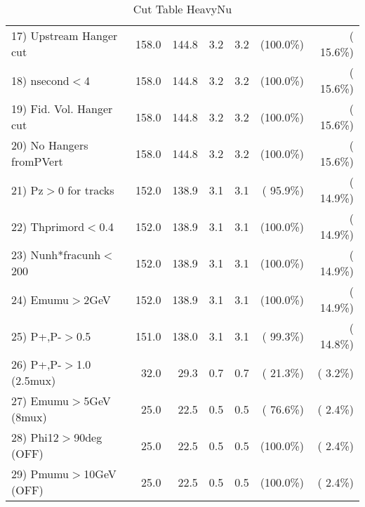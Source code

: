 \begin{table}[h!]
\begin{tabular}{||l||r|r|r|r|r|r||}
 17) Upstream Hanger cut  &        158.0 &        144.8 &          3.2 &          3.2 & (100.0\%) & ( 15.6\%) \\
 18) nsecond$<$4          &        158.0 &        144.8 &          3.2 &          3.2 & (100.0\%) & ( 15.6\%) \\
 19) Fid. Vol. Hanger cut &        158.0 &        144.8 &          3.2 &          3.2 & (100.0\%) & ( 15.6\%) \\
 20) No Hangers fromPVert &        158.0 &        144.8 &          3.2 &          3.2 & (100.0\%) & ( 15.6\%) \\
 21) Pz$>$0 for tracks    &        152.0 &        138.9 &          3.1 &          3.1 & ( 95.9\%) & ( 14.9\%) \\
 22) Thprimord$<$0.4      &        152.0 &        138.9 &          3.1 &          3.1 & (100.0\%) & ( 14.9\%) \\
 23) Nunh*fracunh$<$200   &        152.0 &        138.9 &          3.1 &          3.1 & (100.0\%) & ( 14.9\%) \\
 24) Emumu$>$2GeV         &        152.0 &        138.9 &          3.1 &          3.1 & (100.0\%) & ( 14.9\%) \\
 25) P+,P-$>$0.5          &        151.0 &        138.0 &          3.1 &          3.1 & ( 99.3\%) & ( 14.8\%) \\
 26) P+,P-$>$1.0 (2.5mux) &         32.0 &         29.3 &          0.7 &          0.7 & ( 21.3\%) & (  3.2\%) \\
 27) Emumu$>$5GeV  (8mux) &         25.0 &         22.5 &          0.5 &          0.5 & ( 76.6\%) & (  2.4\%) \\
 28) Phi12$>$90deg  (OFF) &         25.0 &         22.5 &          0.5 &          0.5 & (100.0\%) & (  2.4\%) \\
 29) Pmumu$>$10GeV  (OFF) &         25.0 &         22.5 &          0.5 &          0.5 & (100.0\%) & (  2.4\%) \\
 \hline
 \hline
 \end{tabular}
 \caption{Cut Table  HeavyNu  }
 \label{tab-cutheavy_neutrino}
 \end{table}
